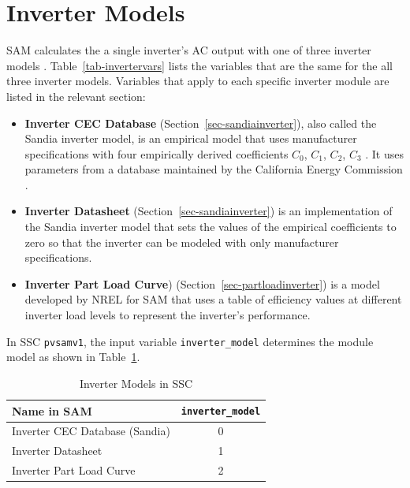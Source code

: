 \documentclass[12pt,letterpaper]{article}
\begin{document}
\section{Inverter Models}\label{sec-inverteroptions}

SAM calculates the a single inverter's AC output with one of three inverter models \citep{blair2013}. Table~\ref{tab-invertervars} lists the variables that are the same for the all three inverter models. Variables that apply to each specific inverter module are listed in the relevant section:

\begin{itemize}
\item \textbf{Inverter CEC Database} (Section~\ref{sec-sandiainverter}), also called the Sandia inverter model, is an empirical model that uses manufacturer specifications with four empirically derived coefficients $C_0$, $C_1$, $C_2$, $C_3$ \citep{king2007}. It uses parameters from a database maintained by the California Energy Commission \citep{gsc2014a}.
\item \textbf{Inverter Datasheet} (Section~\ref{sec-sandiainverter}) is an implementation of the Sandia inverter model that sets the values of the empirical coefficients to zero so that the inverter can be modeled with only manufacturer specifications.
\item \textbf{Inverter Part Load Curve}) (Section~\ref{sec-partloadinverter}) is a model developed by NREL for SAM that uses a table of efficiency values at different inverter load levels to represent the inverter's performance.
\end{itemize}

In SSC \texttt{pvsamv1}, the input variable \texttt{inverter\_model} determines the module model as shown in Table~\ref{tab-invertersubmodels}.

\begin{table}
\begin{center}
\caption{Inverter Models in SSC}
\begin{tabular}{lc}
\midrule
Name in SAM & \texttt{inverter\_model} \\
\midrule
Inverter CEC Database (Sandia) & 0 \\
Inverter Datasheet & 1 \\
Inverter Part Load Curve & 2 \\
\hline
\end{tabular}
\label{tab-invertersubmodels}
\end{center}
\end{table}
\end{document}
